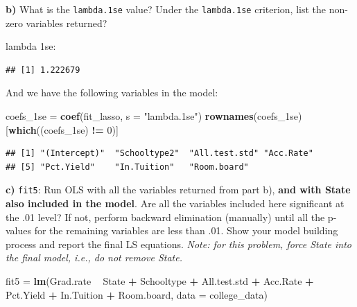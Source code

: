 \documentclass[]{article}
\newenvironment{Shaded}{\begin{snugshade}}{\end{snugshade}}
\newcommand{\KeywordTok}[1]{\textcolor[rgb]{0.13,0.29,0.53}{\textbf{#1}}}
\newcommand{\DataTypeTok}[1]{\textcolor[rgb]{0.13,0.29,0.53}{#1}}
\newcommand{\DecValTok}[1]{\textcolor[rgb]{0.00,0.00,0.81}{#1}}
\newcommand{\StringTok}[1]{\textcolor[rgb]{0.31,0.60,0.02}{#1}}
\newcommand{\OperatorTok}[1]{\textcolor[rgb]{0.81,0.36,0.00}{\textbf{#1}}}
\newcommand{\NormalTok}[1]{#1}
\begin{document}
\textbf{b)} What is the \texttt{lambda.1se} value? Under the
\texttt{lambda.1se} criterion, list the non-zero variables returned?

lambda 1se:

\begin{Shaded}
\end{Shaded}

\begin{verbatim}
## [1] 1.222679
\end{verbatim}

And we have the following variables in the model:

\begin{Shaded}
\begin{Highlighting}[]
\NormalTok{coefs_1se =}\StringTok{ }\KeywordTok{coef}\NormalTok{(fit_lasso, }\DataTypeTok{s =} \StringTok{"lambda.1se"}\NormalTok{)}
\KeywordTok{rownames}\NormalTok{(coefs_1se)[}\KeywordTok{which}\NormalTok{((coefs_1se) }\OperatorTok{!=}\StringTok{ }\DecValTok{0}\NormalTok{)]}
\end{Highlighting}
\end{Shaded}

\begin{verbatim}
## [1] "(Intercept)"  "Schooltype2"  "All.test.std" "Acc.Rate"    
## [5] "Pct.Yield"    "In.Tuition"   "Room.board"
\end{verbatim}

\textbf{c)} \texttt{fit5}: Run OLS with all the variables returned from
part b), \textbf{and with State also included in the model}. Are all the
variables included here significant at the .01 level? If not, perform
backward elimination (manually) until all the p-values for the remaining
variables are less than .01. Show your model building process and report
the final LS equations. \emph{Note: for this problem, force State into
the final model, i.e., do not remove State.}

\begin{Shaded}
\begin{Highlighting}[]
\NormalTok{fit5 =}\StringTok{ }\KeywordTok{lm}\NormalTok{(Grad.rate }\OperatorTok{~}\StringTok{ }\NormalTok{State }\OperatorTok{+}\StringTok{ }\NormalTok{Schooltype }\OperatorTok{+}\StringTok{ }\NormalTok{All.test.std }\OperatorTok{+}\StringTok{ }\NormalTok{Acc.Rate }\OperatorTok{+}\StringTok{ }\NormalTok{Pct.Yield }\OperatorTok{+}\StringTok{ }
\StringTok{    }\NormalTok{In.Tuition }\OperatorTok{+}\StringTok{ }\NormalTok{Room.board, }\DataTypeTok{data =}\NormalTok{ college_data)}
\end{Highlighting}
\end{Shaded}
\end{document}
